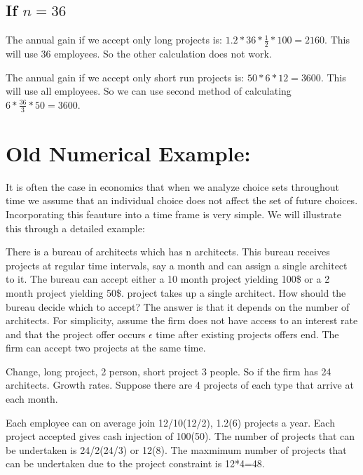 \documentclass[12pt]{report}
\numberwithin{equation}{section}
\begin{document}
\subsection{If $n=36$ }

The annual gain if we accept only long projects is: $1.2*36*\frac{1}{2}*100=2160$. This will use 36 employees. So the other calculation does not work. 

The annual gain if we accept only short run projects is: $50*6*12=3600$. This will use all employees. So we can use second method of calculating $6*\frac{36}{3}*50=3600$. 

\section{Old Numerical Example:}

It is often the case in economics that when we analyze choice sets throughout time we assume that an individual choice does not affect the set of future choices. Incorporating this feauture into a time frame is very simple. We will illustrate this through a detailed example: 

There is a bureau of architects which has n architects. This bureau receives projects at regular time intervals, say a month and can assign a single architect to it. The bureau can accept either a 10 month project yielding 100\$ or a 2 month project yielding 50\$.   project takes up a single architect. How should the bureau decide which to accept? The answer is that it depends on the number of architects. For simplicity, assume the firm does not have access to an interest rate and that the project offer occurs $\epsilon$ time after existing projects offers end. The firm can accept two projects at the same time. 

Change, long project, 2 person, short project 3 people. So if the firm has 24 architects. Growth rates. Suppose there are 4 projects of each type that arrive at each month.  

Each employee can on average join 12/10(12/2), 1.2(6) projects a year. Each project accepted gives cash injection of 100(50). The number of projects that can be undertaken is 24/2(24/3) or 12(8). The maxmimum number of projects that can be undertaken due to the project constraint is 12*4=48.  
\end{document}
